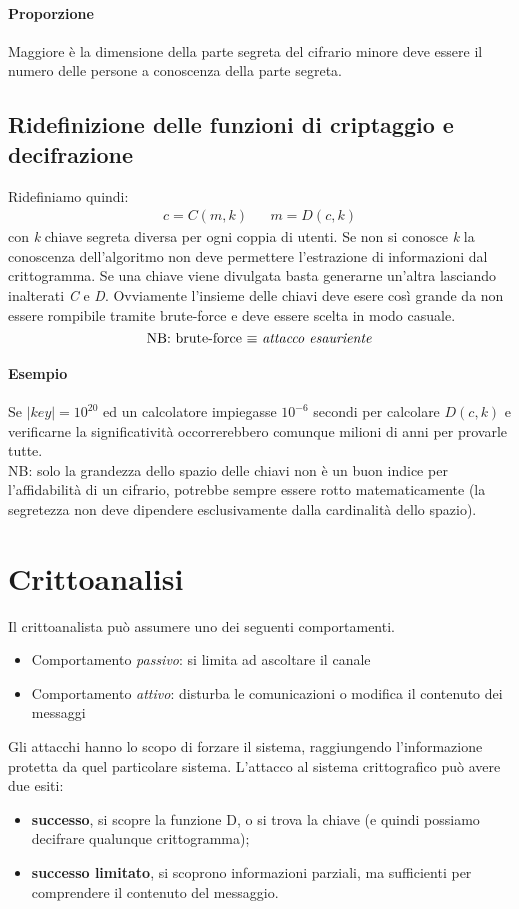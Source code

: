 \paragraph{Proporzione} Maggiore è la dimensione della parte segreta del cifrario minore deve essere il numero delle persone a conoscenza della parte segreta.

\subsection{Ridefinizione delle funzioni di criptaggio e decifrazione}
Ridefiniamo quindi:
\begin{align*}
	c = C(m, k) && m = D(c, k)
\end{align*}
con \emph{k} chiave segreta diversa per ogni coppia di utenti.
Se non si conosce \emph{k} la conoscenza dell'algoritmo non deve permettere l'estrazione di informazioni dal crittogramma. Se una chiave viene divulgata basta generarne un'altra lasciando inalterati \emph{C} e \emph{D}.
Ovviamente l'insieme delle chiavi deve esere così grande da non essere rompibile tramite brute-force e deve essere scelta in modo casuale.
\[\text{NB: brute-force $\equiv$ \emph{attacco esauriente}}\]
\paragraph{Esempio} Se $|key| = 10^{20}$ ed un calcolatore impiegasse $10^{-6}$ secondi per calcolare $D(c, k)$ e verificarne la significatività occorrerebbero comunque milioni di anni per provarle tutte.\\NB: solo la grandezza dello spazio delle chiavi non è un buon indice per l'affidabilità di un cifrario, potrebbe sempre essere rotto matematicamente (la segretezza non deve dipendere esclusivamente dalla cardinalità dello spazio).

\section{Crittoanalisi}
Il crittoanalista può assumere uno dei seguenti comportamenti.
\begin{itemize}
    \item Comportamento \emph{passivo}: si limita ad ascoltare il canale
    \item Comportamento \emph{attivo}:  disturba le comunicazioni o modifica il contenuto dei messaggi
\end{itemize}
Gli attacchi hanno lo scopo di forzare il sistema, raggiungendo l’informazione protetta da quel particolare sistema. L'attacco al sistema crittografico può avere due esiti:
\begin{itemize}
	\item \textbf{successo}, si scopre la funzione D, o si trova la chiave (e quindi possiamo decifrare qualunque crittogramma);
	\item \textbf{successo limitato}, si scoprono informazioni parziali, ma sufficienti per comprendere il contenuto del messaggio.
\end{itemize}
